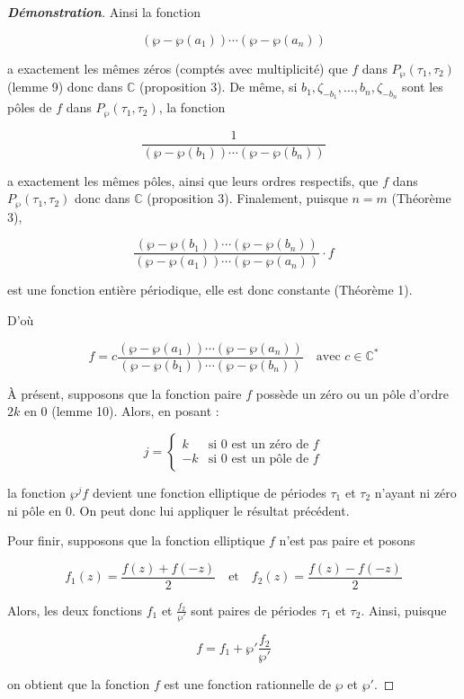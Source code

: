 \documentclass[12pt]{article}
\begin{document}
\begin{proof}[\textbf{Démonstration}]
                    Ainsi la fonction

                    \[
                    (\wp - \wp(a_1)) \cdots (\wp - \wp(a_n))
                    \]

                    a exactement les mêmes zéros (comptés avec multiplicité) que \(f\) dans \(P_{\wp}(\tau_1, \tau_2)\) (lemme 9) donc dans \(\mathbb{C}\) (proposition 3). De même, si \(b_1, \zeta_{-b_1}, \ldots, b_n, \zeta_{-b_n}\) sont les pôles de \(f\) dans \(P_{\wp}(\tau_1, \tau_2)\), la fonction

                    \[
                    \frac{1}{(\wp - \wp(b_1)) \cdots (\wp - \wp(b_n))}
                    \]

                    a exactement les mêmes pôles, ainsi que leurs ordres respectifs, que \(f\) dans \(P_{\wp}(\tau_1, \tau_2)\) donc dans \(\mathbb{C}\) (proposition 3). Finalement, puisque \(n = m\) (Théorème 3),

                    \[
                    \frac{(\wp - \wp(b_1)) \cdots (\wp - \wp(b_n))}{(\wp - \wp(a_1)) \cdots (\wp - \wp(a_n))} \cdot f
                    \]

                    est une fonction entière périodique, elle est donc constante (Théorème 1).

                    D'où

                    \[
                    f = c \frac{(\wp - \wp(a_1)) \cdots (\wp - \wp(a_n))}{(\wp - \wp(b_1)) \cdots (\wp - \wp(b_n))} \quad \text{avec } c \in \mathbb{C}^*
                    \]

                    À présent, supposons que la fonction paire \(f\) possède un zéro ou un pôle d'ordre \(2k\) en 0 (lemme 10). Alors, en posant :

                    \[
                    j = \begin{cases}
                        k & \text{si } 0 \text{ est un zéro de } f \\
                        -k & \text{si } 0 \text{ est un pôle de } f
                        \end{cases}
                    \]

                    la fonction \(\wp^j f\) devient une fonction elliptique de périodes \(\tau_1\) et \(\tau_2\) n’ayant ni zéro ni pôle en 0. On peut donc lui appliquer le résultat précédent.

                    Pour finir, supposons que la fonction elliptique \(f\) n’est pas paire et posons

                    \[
                    f_1(z) = \frac{f(z) + f(-z)}{2} \quad \text{et} \quad f_2(z) = \frac{f(z) - f(-z)}{2}
                    \]

                    Alors, les deux fonctions \(f_1\) et \(\frac{f_2}{\wp'}\) sont paires de périodes \(\tau_1\) et \(\tau_2\). Ainsi, puisque

                    \[
                    f = f_1 + \wp' \frac{f_2}{\wp'}
                    \]

                    on obtient que la fonction \(f\) est une fonction rationnelle de \(\wp\) et \(\wp'\).
                    \end{proof}
\end{document}

